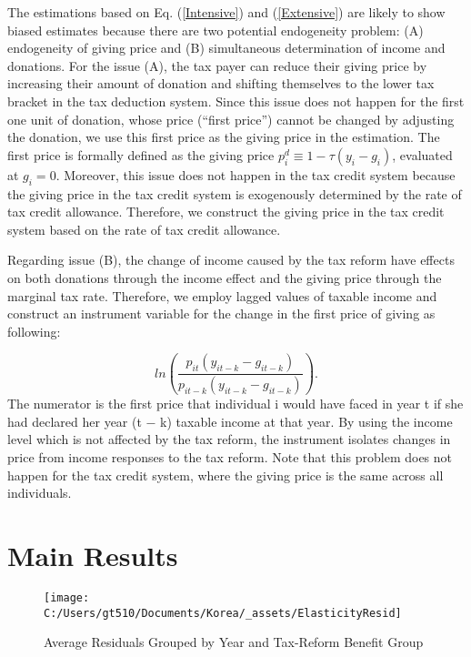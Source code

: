 \documentclass[ review  , 3p ]{elsarticle}
\begin{document}
  The estimations based on Eq. (\ref{Intensive}) and (\ref{Extensive}) are likely to show biased estimates because there are two potential endogeneity problem: (A) endogeneity of giving price and (B) simultaneous determination of income and donations. For the issue (A), the tax payer can reduce their giving price by increasing their amount of donation and shifting themselves to the lower tax bracket in the tax deduction system. Since this issue does not happen for the first one unit of donation, whose price (``first price'') cannot be changed by adjusting the donation, we use this first price as the giving price in the estimation. The first price is formally defined as the giving price \(p^d_i\equiv 1−\tau (y_i−g_i)\), evaluated at \(g_i=0\). Moreover, this issue does not happen in the tax credit system because the giving price in the tax credit system is exogenously determined by the rate of tax credit allowance. Therefore, we construct the giving price in the tax credit system based on the rate of tax credit allowance.
  
  Regarding issue (B), the change of income caused by the tax reform have effects on both donations through the income effect and the giving price through the marginal tax rate. Therefore, we employ lagged values of taxable income and construct an instrument variable for the change in the first price of giving as following:
  
  \[
  ln (\frac{p_{it}(y_{it-k} - g_{it-k})}{p_{it-k}(y_{it-k} - g_{it-k})}).
  \]
  The numerator is the first price that individual i would have faced in year t if she had declared her year (t − k) taxable income at that year. By using the income level which is not affected by the tax reform, the instrument isolates changes in price from income responses to the tax reform. Note that this problem does not happen for the tax credit system, where the giving price is the same across all individuals.
  
  \hypertarget{main-results}{%
  \section{Main Results}\label{main-results}}
  
  \begin{figure}
  
  {\centering \texttt{[image: C:/Users/gt510/Documents/Korea/\_assets/ElasticityResid]} 
  
  }
  
  \caption{Average Residuals Grouped by Year and Tax-Reform Benefit Group}\label{fig:unnamed-chunk-2}
  \end{figure}
  
\end{document}
